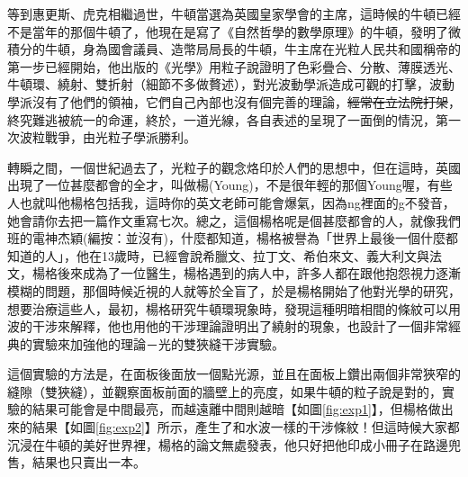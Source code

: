 等到惠更斯、虎克相繼過世，牛頓當選為英國皇家學會的主席，這時候的牛頓已經不是當年的那個牛頓了，他現在是寫了《自然哲學的數學原理》的牛頓，發明了微積分的牛頓，身為國會議員、造幣局局長的牛頓，牛主席在光粒人民共和國稱帝的第一步已經開始，他出版的《光學》用粒子說證明了色彩疊合、分散、薄膜透光、牛頓環、繞射、雙折射（細節不多做贅述），對光波動學派造成可觀的打擊，波動學派沒有了他們的領袖，它們自己內部也沒有個完善的理論，\sout{經常在立法院打架}，終究難逃被統一的命運，終於，一道光線，各自表述的呈現了一面倒的情況，第一次波粒戰爭，由光粒子學派勝利。

轉瞬之間，一個世紀過去了，光粒子的觀念烙印於人們的思想中，但在這時，英國出現了一位甚麼都會的全才，叫做楊(Young)，不是很年輕的那個Young喔，有些人也就叫他楊格包括我，這時你的英文老師可能會爆氣，因為ng裡面的g不發音，她會請你去把一篇作文重寫七次。總之，這個楊格呢是個甚麼都會的人，就像我們班的電神杰穎(編按：並沒有)，什麼都知道，楊格被譽為「世界上最後一個什麼都知道的人」，他在13歲時，已經會說希臘文、拉丁文、希伯來文、義大利文與法文，楊格後來成為了一位醫生，楊格遇到的病人中，許多人都在跟他抱怨視力逐漸模糊的問題，那個時候近視的人就等於全盲了，於是楊格開始了他對光學的研究，想要治療這些人，最初，楊格研究牛頓環現象時，發現這種明暗相間的條紋可以用波的干涉來解釋，他也用他的干涉理論證明出了繞射的現象，也設計了一個非常經典的實驗來加強他的理論－光的雙狹縫干涉實驗。
	
	這個實驗的方法是，在面板後面放一個點光源，並且在面板上鑽出兩個非常狹窄的縫隙（雙狹縫），並觀察面板前面的牆壁上的亮度，如果牛頓的粒子說是對的，實驗的結果可能會是中間最亮，而越遠離中間則越暗【如圖\ref{fig:exp1}】，但楊格做出來的結果【如圖\ref{fig:exp2}】所示，產生了和水波一樣的干涉條紋！但這時候大家都沉浸在牛頓的美好世界裡，楊格的論文無處發表，他只好把他印成小冊子在路邊兜售，結果也只賣出一本。

